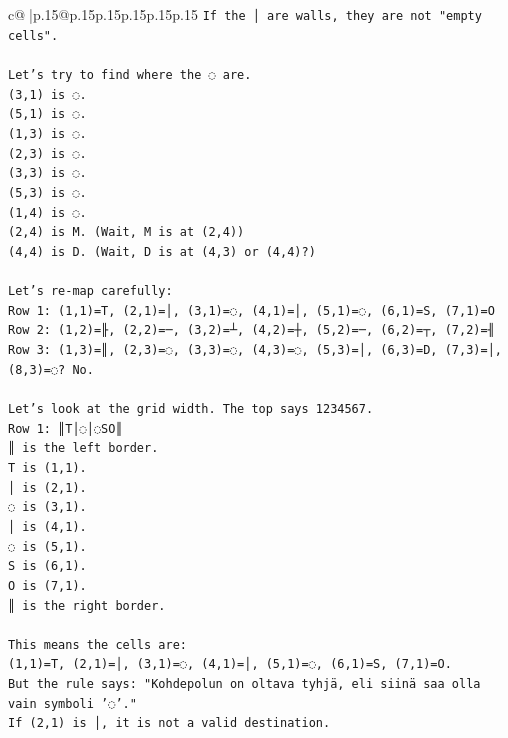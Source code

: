 \documentclass{article}
\begin{document}
{\begin{supertabular}{c@{$\;$}|p{.15\linewidth}@{}p{.15\linewidth}p{.15\linewidth}p{.15\linewidth}p{.15\linewidth}p{.15\linewidth}}
{{{\texttt{If the │ are walls, they are not "empty cells".} \\
\\ 
\texttt{Let's try to find where the ◌ are.} \\
\texttt{(3,1) is ◌.} \\
\texttt{(5,1) is ◌.} \\
\texttt{(1,3) is ◌.} \\
\texttt{(2,3) is ◌.} \\
\texttt{(3,3) is ◌.} \\
\texttt{(5,3) is ◌.} \\
\texttt{(1,4) is ◌.} \\
\texttt{(2,4) is M. (Wait, M is at (2,4))} \\
\texttt{(4,4) is D. (Wait, D is at (4,3) or (4,4)?)} \\
\\ 
\texttt{Let's re{-}map carefully:} \\
\texttt{Row 1: (1,1)=T, (2,1)=│, (3,1)=◌, (4,1)=│, (5,1)=◌, (6,1)=S, (7,1)=O} \\
\texttt{Row 2: (1,2)=╟, (2,2)=─, (3,2)=┴, (4,2)=┼, (5,2)=─, (6,2)=┬, (7,2)=╢} \\
\texttt{Row 3: (1,3)=║, (2,3)=◌, (3,3)=◌, (4,3)=◌, (5,3)=│, (6,3)=D, (7,3)=│, (8,3)=◌? No.} \\
\\ 
\texttt{Let's look at the grid width. The top says 1234567.} \\
\texttt{Row 1: ║T│◌│◌SO║} \\
\texttt{║ is the left border.} \\
\texttt{T is (1,1).} \\
\texttt{│ is (2,1).} \\
\texttt{◌ is (3,1).} \\
\texttt{│ is (4,1).} \\
\texttt{◌ is (5,1).} \\
\texttt{S is (6,1).} \\
\texttt{O is (7,1).} \\
\texttt{║ is the right border.} \\
\\ 
\texttt{This means the cells are:} \\
\texttt{(1,1)=T, (2,1)=│, (3,1)=◌, (4,1)=│, (5,1)=◌, (6,1)=S, (7,1)=O.} \\
\texttt{But the rule says: "Kohdepolun on oltava tyhjä, eli siinä saa olla vain symboli '◌'."} \\
\texttt{If (2,1) is │, it is not a valid destination.} \\
}}}
\end{supertabular}}
\end{document}
